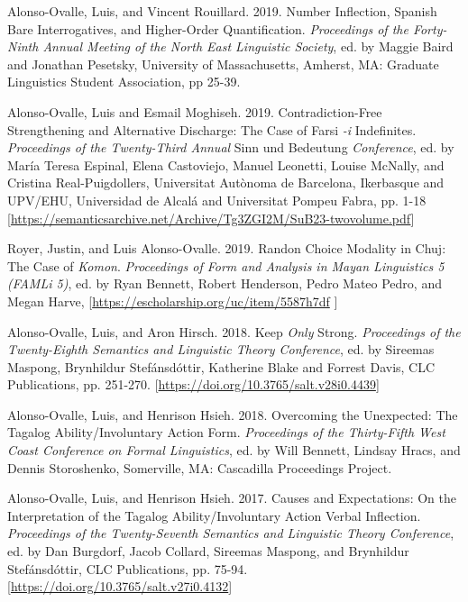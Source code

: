 \documentclass[11pt]{article}
\begin{document}
Alonso-Ovalle, Luis, and Vincent Rouillard. 2019. Number Inflection, Spanish Bare Interrogatives, and Higher-Order Quantification. \textit{Proceedings
of the Forty-Ninth Annual Meeting of the North East Linguistic Society}, ed. by Maggie Baird and Jonathan Pesetsky, University of Massachusetts, Amherst, MA: Graduate Linguistics Student Association, pp 25-39.
 
 Alonso-Ovalle, Luis and Esmail Moghiseh. 2019. Contradiction-Free Strengthening and Alternative Discharge: The Case of Farsi \textit{-i} Indefinites. \textit{Proceedings of the Twenty-Third Annual} Sinn und Bedeutung \textit{Conference}, ed. by Mar\'ia Teresa Espinal, Elena Castoviejo, Manuel Leonetti, Louise McNally, and Cristina Real-Puigdollers, Universitat Aut\`onoma de Barcelona, Ikerbasque and UPV/EHU, Universidad de Alcal\'a and Universitat Pompeu Fabra, pp. 1-18 {\footnotesize [\href{https://semanticsarchive.net/Archive/Tg3ZGI2M/SuB23-twovolume.pdf}{https://semanticsarchive.net/Archive/Tg3ZGI2M/SuB23-twovolume.pdf}]}
      
 Royer, Justin, and Luis Alonso-Ovalle. 2019. Randon Choice Modality in Chuj: The Case of \textit{Komon}. \textit{Proceedings of Form and Analysis in Mayan Linguistics 5 (FAMLi 5)}, ed. by Ryan Bennett, Robert Henderson, Pedro Mateo Pedro, and Megan Harve, {\footnotesize [\href{https://escholarship.org/uc/item/5587h7df}{https://escholarship.org/uc/item/5587h7df} ]}
      
Alonso-Ovalle, Luis, and Aron Hirsch. 2018. Keep \textit{Only} Strong. \textit{Proceedings of the Twenty-Eighth Semantics and Linguistic Theory Conference}, ed. by Sireemas Maspong, Brynhildur Stef\'ansd\'ottir, Katherine Blake and Forrest Davis, CLC Publications, pp. 251-270. {\footnotesize [\href{https://doi.org/10.3765/salt.v28i0.4439}{https://doi.org/10.3765/salt.v28i0.4439}]}
       
 Alonso-Ovalle, Luis, and Henrison Hsieh. 2018. Overcoming the Unexpected: The Tagalog Ability/Involuntary Action Form.  \textit{Proceedings of the Thirty-Fifth West Coast Conference on Formal Linguistics}, ed. by Will Bennett, Lindsay Hracs, and Dennis Storoshenko, Somerville, MA: Cascadilla Proceedings Project.      
      
 Alonso-Ovalle, Luis, and Henrison Hsieh. 2017. Causes and Expectations: On the Interpretation of the Tagalog Ability/Involuntary Action Verbal Inflection. \textit{Proceedings of the Twenty-Seventh Semantics and Linguistic Theory Conference}, ed. by Dan Burgdorf, Jacob Collard, Sireemas Maspong, and Brynhildur Stef\'ansd\'ottir, CLC Publications, pp. 75-94. {\footnotesize [\href{https://doi.org/10.3765/salt.v27i0.4132}{https://doi.org/10.3765/salt.v27i0.4132}]}
\end{document}
